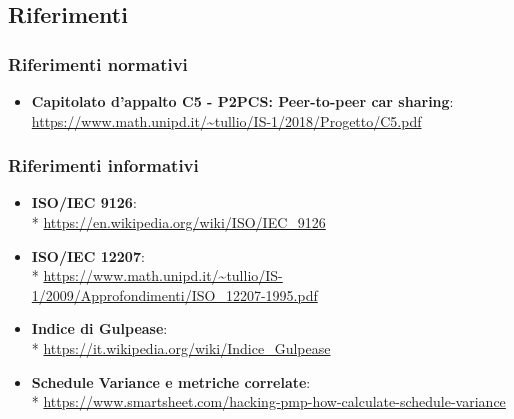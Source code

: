\subsection{Riferimenti}
\subsubsection{Riferimenti normativi}
\begin{itemize}

\item \textbf{Capitolato d'appalto C5 - P2PCS: Peer-to-peer car sharing}: \\ \url{https://www.math.unipd.it/~tullio/IS-1/2018/Progetto/C5.pdf}
\end{itemize}
\subsubsection{Riferimenti informativi}
\begin{itemize}
\item \textbf{ISO/IEC 9126}: \\* \url{https://en.wikipedia.org/wiki/ISO/IEC_9126}
\item \textbf{ISO/IEC 12207}: \\* 
\url{https://www.math.unipd.it/~tullio/IS-1/2009/Approfondimenti/ISO\_12207-1995.pdf}
\item \textbf{Indice di Gulpease}: \\* \url{https://it.wikipedia.org/wiki/Indice_Gulpease}
\item \textbf{Schedule Variance e metriche correlate}:\\* \url{https://www.smartsheet.com/hacking-pmp-how-calculate-schedule-variance}
\end{itemize}